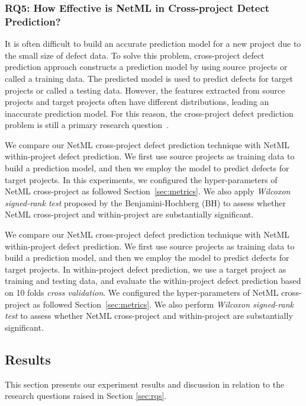 \subsubsection{RQ5: How Effective is NetML in Cross-project Detect Prediction?}
It is often difficult to build an accurate prediction model for a new project due to the small size of defect data. To solve this problem, cross-project defect prediction approach constructs a prediction model by using source projects or called a training data. The predicted model is used to predict defects for target projects or called a testing data. However, the features extracted from source projects and target projects often have different distributions, leading an inaccurate prediction model. For this reason, the cross-project defect prediction problem is still a primary research question~\cite{Nam:2015:HDP:2786805.2786814}. 

We compare our NetML cross-project defect prediction technique with NetML within-project defect prediction. We first use source projects as training data to build a prediction model, and then we employ the model to predict defects for target projects. In this experiments, we configured the hyper-parameters of NetML cross-project as followed Section~\ref{sec:metrics}. We also apply \textit{Wilcoxon signed-rank test} proposed by the Benjamini-Hochberg (BH) to assess whether NetML cross-project and within-project are substantially significant. 

We compare our NetML cross-project defect prediction technique with NetML within-project defect prediction. We first use source projects as training data to build a prediction model, and then we employ the model to predict defects for target projects. In within-project defect prediction, we use a target project as training and testing data, and evaluate the within-project defect prediction based on 10 folds \textit{cross validation}. We configured the hyper-parameters of NetML cross-project as followed Section~\ref{sec:metrics}. We also perform \textit{Wilcoxon signed-rank test} to assess whether NetML cross-project and within-project are substantially significant. 

\subsection{Results}
This section presents our experiment results and discussion in relation to the research questions raised in Section \ref{sec:rqs}.

